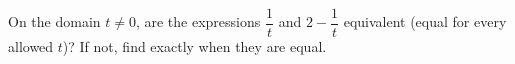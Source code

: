 On the domain $t\ne0$, are the expressions $\dfrac{1}{t}$ and $2-\dfrac{1}{t}$ equivalent (equal for every allowed $t$)? If not, find exactly when they are equal.
